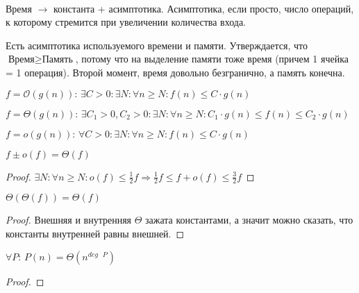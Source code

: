 \\
Время $\to$ константа + асимптотика. Асимптотика, если просто, число операций, к которому стремится при увеличении количества входа. 

Есть асимптотика используемого времени и памяти. Утверждается, что $\text{Время} \ge \text{Память}$, потому что на выделение памяти тоже время (причем 1 ячейка = 1 операция). Второй момент, время довольно безгранично, а память конечна.
\begin{definition}
    $f=\mathcal{O}(g(n))\text{:   } \exists C>0: \exists N: \forall n \ge N: f(n) \le C \cdot g(n)$
\end{definition}
\begin{definition}
    $f=\Theta(g(n))\text{:  } \exists C_1>0,C_2>0: \exists N: \forall n \ge N: C_1\cdot g(n) \le f(n) \le C_2 \cdot g(n) $
\end{definition}
\begin{definition}
    $f = o(g(n))\text{:   } \forall C>0: \exists N: \forall n \ge N: f(n) \le C \cdot g(n)$
\end{definition}

\begin{property}
    $f \pm o(f) = \Theta(f)$
\end{property}
\begin{proof}
    $\exists N: \forall n \ge N: o(f) \le \frac{1}{2}f \Rightarrow \frac{1}{2}f \le f + o(f) \le \frac{3}{2}f$
\end{proof}

\begin{property}
    $\Theta(\Theta(f)) = \Theta(f)$
\end{property}
\begin{proof}
    Внешняя и внутренняя $\Theta$ зажата константами, а значит можно сказать, что константы внутренней равны внешней. 
\end{proof}
\begin{lemma}
    $\forall P\text{:  } P(n) = \Theta(n^{deg\text{ }P})$
\end{lemma}
\begin{proof}
\end{proof}

